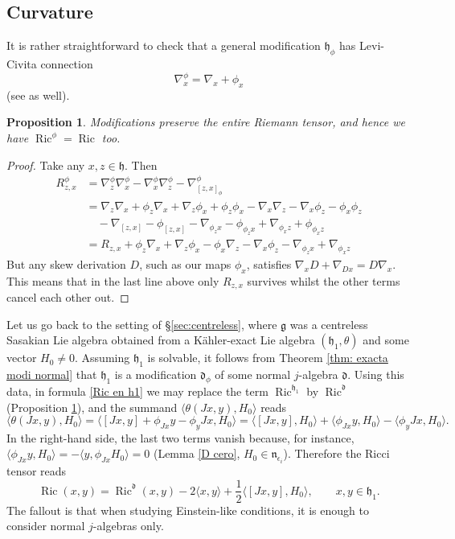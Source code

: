 \documentclass[12pt, twoside]{amsart}
\def\d{\mathfrak{d}}
\def\g{\mathfrak{g}}
\def\h{\mathfrak{h}}
\def\n{\mathfrak{n}}
\def\ric{\operatorname{Ric}}
\newtheorem{prop}[definition]{Proposition}
\theoremstyle{definition}
\begin{document}
\vspace{.5cm}

\subsection{Curvature} 

It is rather straightforward to check that a general modification $\h_{\phi}$ has  Levi-Civita connection 
$$\nabla^{\phi}_{x}=\nabla_{x}+\phi_x$$
(see \cite[Proposition 6]{Cortes} as well). 

\begin{prop}\label{prop: Ricci invariante}
Modifications preserve the entire Riemann tensor, and hence we have $\ric^{\phi}=\ric$ too.
\end{prop}
\begin{proof}
Take any $x, z \in \h$.  Then 
\begin{align*}
    R^{\phi}_{z, x}&=\nabla^{\phi}_{z}\nabla^{\phi}_{x}-\nabla^{\phi}_{x}\nabla^{\phi}_{z}- \nabla^{\phi}_{[z, x]_{\phi}}\\
&=\nabla_{z}\nabla_{x}+\phi_z \nabla_{x}+\nabla_{z}\phi_x +\phi_z\phi_x - \nabla_{x}\nabla_{z}-\nabla_{x}\phi_z  -\phi_x \phi_z \\
&\quad  -\nabla_{[z, x]}-\phi_{[z, x]}- \nabla_{\phi_z x}-\phi_{\phi_z x}+\nabla_{\phi_x z}+\phi_{\phi_x z}\\
&=R_{z, x}+\phi_z \nabla_{x}+\nabla_{z}\phi_x -\phi_x \nabla_{z}-\nabla_{x}\phi_z  -\nabla_{\phi_z x}  + \nabla_{\phi_x z}
\end{align*}
But any skew derivation $D$, such as our maps $\phi_x$, satisfies 
    $\nabla_{x}D +\nabla_{Dx}=D\nabla_{x}$.
This means that in the last line above only $R_{z, x}$ survives whilst the other terms cancel each other out. 
\end{proof}

\smallskip

Let us go back to the setting of \S \ref{sec:centreless}, where $\g$ was a centreless Sasakian Lie algebra obtained from a K{\"a}hler-exact Lie algebra $(\h_1,\theta)$ and some vector $H_0\neq 0$. 
Assuming $\h_1$ is solvable, it follows from Theorem \ref{thm: exacta modi normal} that $\h_1$ is a modification $\d_\phi$ of some normal $j$-algebra $\d$. Using this data, in formula \eqref{Ric en h1} we may replace the term $\ric^{\h_1}$ by $\ric^\d$ (Proposition \ref{prop: Ricci invariante}), and the summand $\langle \theta(Jx,y),H_0\rangle$ reads
\[ \langle \theta(Jx, y), H_0  \rangle=\langle [Jx, y]+\phi_{Jx} y-\phi_yJx,H_0\rangle
    =\langle [Jx, y],H_0\rangle+ \langle \phi_{Jx} y,H_0\rangle -\langle \phi_yJx,H_0 \rangle.
\]
In the right-hand side, the last two terms vanish because, for instance, 
$\langle \phi_{Jx} y,H_0\rangle=-\langle y, \phi_{Jx} H_0 \rangle=0$ (Lemma \ref{D cero}, $H_0 \in \n_{\epsilon_i}$). 
 Therefore the Ricci tensor reads 
\[\ric(x,y)=\ric^{\d}(x,y)-2\langle x, y\rangle +\frac{1}{2}\langle [Jx, y],H_0\rangle, \qquad x,y \in \h_1.\]
The fallout is that when studying Einstein-like conditions, it is enough to consider normal $j$-algebras only.
\medbreak
\end{document}
